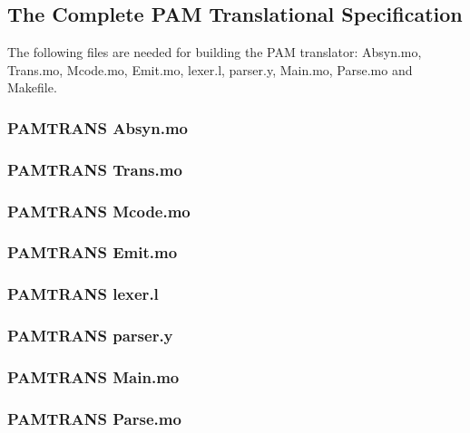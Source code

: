\documentclass[10.5pt,a4]{article}
\begin{document}
\subsection{The Complete PAM Translational Specification}
The following files are needed for building the PAM translator: Absyn.mo, Trans.mo, Mcode.mo, Emit.mo, lexer.l, parser.y, Main.mo, Parse.mo and Makefile.

\subsubsection{PAMTRANS Absyn.mo}


\subsubsection{PAMTRANS Trans.mo}


\subsubsection{PAMTRANS Mcode.mo}


\subsubsection{PAMTRANS Emit.mo}


\lstset{language=}
\subsubsection{PAMTRANS lexer.l}


\subsubsection{PAMTRANS parser.y}

\lstset{language=modelica}

\subsubsection{PAMTRANS Main.mo}


\subsubsection{PAMTRANS Parse.mo}

\end{document}
